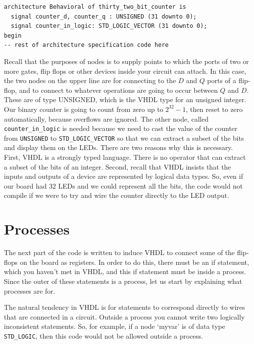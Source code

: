 \documentclass[../physical_computing.tex]{subfiles}
\begin{document}
\begin{verbatim}
architecture Behavioral of thirty_two_bit_counter is
  signal counter_d, counter_q : UNSIGNED (31 downto 0);
  signal counter_in_logic: STD_LOGIC_VECTOR (31 downto 0);
begin
-- rest of architecture specification code here
\end{verbatim}

Recall that the purposes of nodes is to supply points to which the ports of two or more gates, flip flops or other devices inside your circuit can attach. In this case, the two nodes on the upper line are for connecting to the $D$ and $Q$ ports of a flip-flop, and to connect to whatever operations are going to occur between $Q$ and $D$. These are of type UNSIGNED, which is the VHDL type for an unsigned integer. Our binary counter is going to count from zero up to $2^{32}-1$, then reset to zero automatically, because overflows are ignored. The other node, called \texttt{counter\_in\_logic} is needed because we need to cast the value of the counter from \texttt{UNSIGNED} to \texttt{STD\_LOGIC\_VECTOR} so that we can extract a subset of the bits and display them on the LEDs. There are two reasons why this is necessary. First, VHDL is a strongly typed language. There is no operator that can extract a subset of the bits of an integer. Second, recall that VHDL insists that the inputs and outputs of a device are represented by logical data types. So, even if our board had 32 LEDs and we could represent all the bits, the code would not compile if we were to try and wire the counter directly to the LED output.

\section{Processes}
\label{sec:processes}

The next part of the code is written to induce VHDL to connect some of the flip-flops on the board as registers. In order to do this, there must be an if statement, which you haven't met in VHDL, and this if statement must be inside a process. Since the outer of these statements is a process, let us start by explaining what processes are for.

The natural tendency in VHDL is for statements to correspond directly to wires that are connected in a circuit. Outside a process you cannot write two logically inconsistent statements. So, for example, if a node `myvar' is of data type \texttt{STD\_LOGIC}, then this code would not be allowed outside a process.
\end{document}
